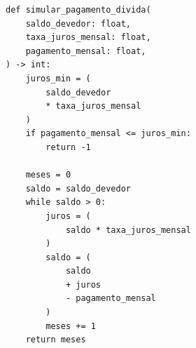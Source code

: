 \ifmostrarGabarito
\begin{verbatim}
def simular_pagamento_divida(
    saldo_devedor: float,
    taxa_juros_mensal: float,
    pagamento_mensal: float,
) -> int:
    juros_min = (
        saldo_devedor
        * taxa_juros_mensal
    )
    if pagamento_mensal <= juros_min:
        return -1
    
    meses = 0
    saldo = saldo_devedor
    while saldo > 0:
        juros = (
            saldo * taxa_juros_mensal
        )
        saldo = (
            saldo
            + juros
            - pagamento_mensal
        )
        meses += 1
    return meses
\end{verbatim}

\fi
